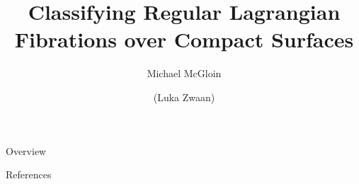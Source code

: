 \documentclass
   [kul] %
   {style/kulakbeamer}
\title{Classifying Regular Lagrangian Fibrations over Compact Surfaces}
\author[Short name]{Michael McGloin \and (Luka Zwaan)}
\institute{KU Leuven}
\begin{document}
\begin{titleframe}
   \titlepage
\end{titleframe}

\begin{frame}{Overview}
   \tableofcontents
\end{frame}


\begin{frame}[allowframebreaks]{References}
   \printbibliography
\end{frame}
\end{document}
